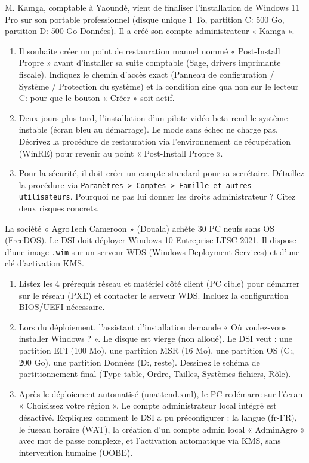 \documentclass[11pt]{article}
\begin{document}
\begin{exercice}
M. Kamga, comptable à Yaoundé, vient de finaliser l'installation de Windows 11 Pro sur son portable professionnel (disque unique 1 To, partition C: 500 Go, partition D: 500 Go Données). Il a créé son compte administrateur « Kamga ».
\begin{enumerate}
    \item Il souhaite créer un point de restauration manuel nommé « Post-Install Propre » avant d'installer sa suite comptable (Sage, drivers imprimante fiscale). Indiquez le chemin d'accès exact (Panneau de configuration / Système / Protection du système) et la condition sine qua non sur le lecteur C: pour que le bouton « Créer » soit actif.
    \item Deux jours plus tard, l'installation d'un pilote vidéo beta rend le système instable (écran bleu au démarrage). Le mode sans échec ne charge pas. Décrivez la procédure de restauration via l'environnement de récupération (WinRE) pour revenir au point « Post-Install Propre ».
    \item Pour la sécurité, il doit créer un compte standard pour sa secrétaire. Détaillez la procédure via \texttt{Paramètres > Comptes > Famille et autres utilisateurs}. Pourquoi ne pas lui donner les droits administrateur ? Citez deux risques concrets.
\end{enumerate}
\end{exercice}

\begin{exercice}
La société « AgroTech Cameroon » (Douala) achète 30 PC neufs sans OS (FreeDOS). Le DSI doit déployer Windows 10 Entreprise LTSC 2021. Il dispose d'une image \texttt{.wim} sur un serveur WDS (Windows Deployment Services) et d'une clé d'activation KMS.
\begin{enumerate}
    \item Listez les 4 prérequis réseau et matériel côté client (PC cible) pour démarrer sur le réseau (PXE) et contacter le serveur WDS. Incluez la configuration BIOS/UEFI nécessaire.
    \item Lors du déploiement, l'assistant d'installation demande « Où voulez-vous installer Windows ? ». Le disque est vierge (non alloué). Le DSI veut : une partition EFI (100 Mo), une partition MSR (16 Mo), une partition OS (C:, 200 Go), une partition Données (D:, reste). Dessinez le schéma de partitionnement final (Type table, Ordre, Tailles, Systèmes fichiers, Rôle).
    \item Après le déploiement automatisé (unattend.xml), le PC redémarre sur l'écran « Choisissez votre région ». Le compte administrateur local intégré est désactivé. Expliquez comment le DSI a pu préconfigurer : la langue (fr-FR), le fuseau horaire (WAT), la création d'un compte admin local « AdminAgro » avec mot de passe complexe, et l'activation automatique via KMS, sans intervention humaine (OOBE).
\end{enumerate}
\end{exercice}
\end{document}
